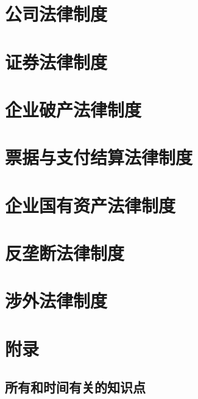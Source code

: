 \documentclass[UTF8,12pt]{ctexart}
\numberwithin{equation}{section} %
\numberwithin{figure}{section}
\numberwithin{table}{section}
\begin{document}
	 
	
	    
	
	\newpage
	\section{公司法律制度}
	
	
	\newpage
	\section{证券法律制度}
	
	\newpage
	\section{企业破产法律制度}
	
	\newpage
	\section{票据与支付结算法律制度}
	
	\newpage
	\section{企业国有资产法律制度}
	
	\newpage
	\section{反垄断法律制度}
	
	\newpage
	\section{涉外法律制度}
	
	\newpage
	\section{附录}
	\subsection{所有和时间有关的知识点}
	
\end{document}
